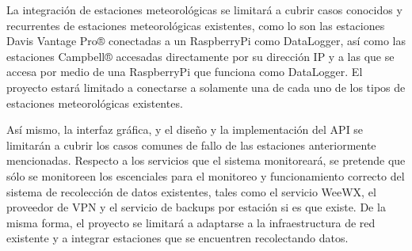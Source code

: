 La integración de estaciones meteorológicas se limitará a cubrir casos conocidos y recurrentes de estaciones meteorológicas existentes, como lo son las estaciones Davis Vantage Pro® conectadas a un RaspberryPi como DataLogger, así como las estaciones Campbell® accesadas directamente por su dirección IP y a las que se accesa por medio de una RaspberryPi que funciona como DataLogger. El proyecto estará limitado a conectarse a solamente una de cada uno de los tipos de estaciones meteorológicas existentes.

Así mismo, la interfaz gráfica, y el diseño y la implementación del API se limitarán a cubrir los casos comunes de fallo de las estaciones anteriormente mencionadas. Respecto a los servicios que el sistema monitoreará, se pretende que sólo se monitoreen los escenciales para el monitoreo y funcionamiento correcto del sistema de recolección de datos existentes, tales como el servicio WeeWX, el proveedor de VPN y el servicio de backups por estación si es que existe. De la misma forma, el proyecto se limitará a adaptarse a la infraestructura de red existente y a integrar estaciones que se encuentren recolectando datos.
